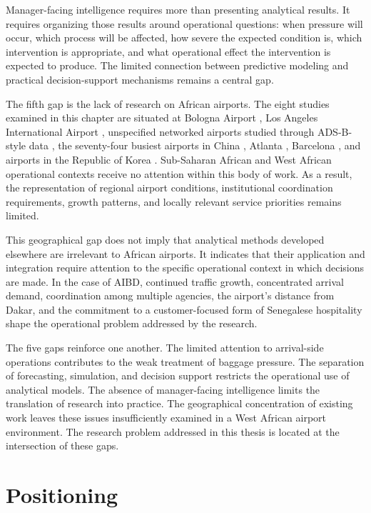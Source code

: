 Manager-facing intelligence requires more than presenting analytical results. It requires organizing those results around operational questions: when pressure will occur, which process will be affected, how severe the expected condition is, which intervention is appropriate, and what operational effect the intervention is expected to produce. The limited connection between predictive modeling and practical decision-support mechanisms remains a central gap.

The fifth gap is the lack of research on African airports. The eight studies examined in this chapter are situated at Bologna Airport \parencite{orsini2019neural}, Los Angeles International Airport \parencite{shao2019flight,shao2022predicting}, unspecified networked airports studied through ADS-B-style data \parencite{zhang2021spatiotemporal}, the seventy-four busiest airports in China \parencite{zhu2024spatiotemporal}, Atlanta \parencite{pang2024machine}, Barcelona \parencite{cao2025robust}, and airports in the Republic of Korea \parencite{sang2026integrating}. Sub-Saharan African and West African operational contexts receive no attention within this body of work. As a result, the representation of regional airport conditions, institutional coordination requirements, growth patterns, and locally relevant service priorities remains limited.

This geographical gap does not imply that analytical methods developed elsewhere are irrelevant to African airports. It indicates that their application and integration require attention to the specific operational context in which decisions are made. In the case of AIBD, continued traffic growth, concentrated arrival demand, coordination among multiple agencies, the airport's distance from Dakar, and the commitment to a customer-focused form of Senegalese hospitality shape the operational problem addressed by the research.

The five gaps reinforce one another. The limited attention to arrival-side operations contributes to the weak treatment of baggage pressure. The separation of forecasting, simulation, and decision support restricts the operational use of analytical models. The absence of manager-facing intelligence limits the translation of research into practice. The geographical concentration of existing work leaves these issues insufficiently examined in a West African airport environment. The research problem addressed in this thesis is located at the intersection of these gaps.

\section{Positioning}
\label{sec:literature-positioning}

